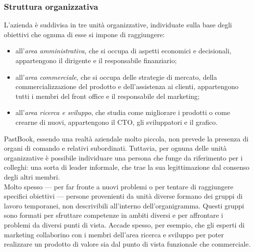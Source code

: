 			\subsubsection{Struttura organizzativa}
				L'azienda è suddivisa in tre unità organizzative, individuate sulla base degli obiettivi che ognuna di esse si impone
				di raggiungere:
				\begin{itemize}
					\item all'\emph{area amministrativa}, che si occupa di aspetti economici e decisionali, appartengono il
					dirigente e il responsabile finanziario;
					\item all'\emph{area commerciale}, che si occupa delle strategie di mercato, della commercializzazione del
					prodotto e dell'assistenza ai clienti, appartengono tutti i membri del front office e il responsabile del
					marketing;
					\item all'\emph{area ricerca e sviluppo}, che studia come migliorare i prodotti o come crearne di nuovi,
					appartengono il CTO, gli sviluppatori e il grafico.
				\end{itemize}
				
				PastBook, essendo una realtà aziendale molto piccola, non prevede la presenza di organi di comando e relativi
				subordinati. Tuttavia, per ognuna delle unità organizzative è possibile individuare una persona che funge da
				riferimento per i colleghi: una sorta di leader informale, che trae la sua legittimazione dal consenso degli altri
				membri.\\
				Molto spesso — per far fronte a nuovi problemi o per tentare di raggiungere specifici obiettivi — persone provenienti
				da unità diverse formano dei gruppi di lavoro temporanei, non descrivibili all'interno dell'organigramma. Questi
				gruppi sono formati per sfruttare competenze in ambiti diversi e per affrontare i problemi da diversi punti di vista.
				Accade spesso, per esempio, che gli esperti di marketing collaborino con i membri dell'area ricerca e sviluppo per
				poter realizzare un prodotto di valore sia dal punto di vista funzionale che commerciale.
